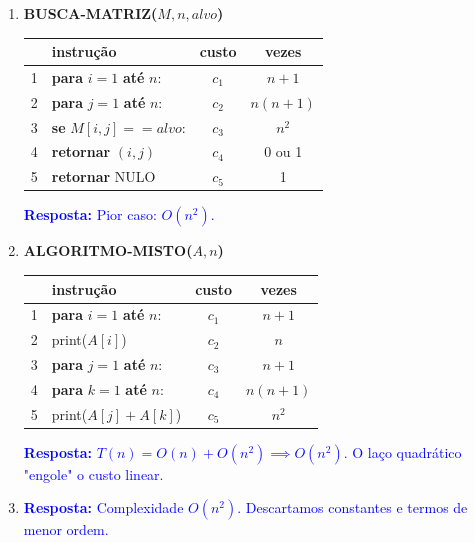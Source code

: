 \documentclass[12pt]{article}
\newcommand{\resposta}[1]{\textcolor{blue}{\textbf{Resposta:} #1}}
\begin{document}
\begin{enumerate}[label=\arabic*), leftmargin=1.5cm, itemsep=1cm]
    \item \textbf{BUSCA-MATRIZ($M, n, alvo$)} \\
    \begin{tcolorbox}[colback=white, colframe=black, fontupper=\small]
        \begin{tabular}{llcc}
            \hline
            & \textbf{instrução} & \textbf{custo} & \textbf{vezes} \\
            \hline
            1 & \textbf{para} $i = 1$ \textbf{até} $n$: & $c_1$ & $n+1$ \\
            2 & \quad \textbf{para} $j = 1$ \textbf{até} $n$: & $c_2$ & $n(n+1)$ \\
            3 & \quad \quad \textbf{se} $M[i,j] == alvo$: & $c_3$ & $n^2$ \\
            4 & \quad \quad \quad \textbf{retornar} $(i,j)$ & $c_4$ & 0 ou 1 \\
            5 & \textbf{retornar} NULO & $c_5$ & 1 \\
            \hline
        \end{tabular}
    \end{tcolorbox}
    \resposta{Pior caso: $O(n^2)$.}

    \item \textbf{ALGORITMO-MISTO($A, n$)} \\
    \begin{tcolorbox}[colback=white, colframe=black, fontupper=\small]
        \begin{tabular}{llcc}
            \hline
            & \textbf{instrução} & \textbf{custo} & \textbf{vezes} \\
            \hline
            1 & \textbf{para} $i = 1$ \textbf{até} $n$: & $c_1$ & $n+1$ \\
            2 & \quad print($A[i]$) & $c_2$ & $n$ \\
            3 & \textbf{para} $j = 1$ \textbf{até} $n$: & $c_3$ & $n+1$ \\
            4 & \quad \textbf{para} $k = 1$ \textbf{até} $n$: & $c_4$ & $n(n+1)$ \\
            5 & \quad \quad print($A[j] + A[k]$) & $c_5$ & $n^2$ \\
            \hline
        \end{tabular}
    \end{tcolorbox}
    \resposta{$T(n) = O(n) + O(n^2) \implies O(n^2)$. O laço quadrático "engole" o custo linear.}

    \item \resposta{Complexidade $O(n^2)$. Descartamos constantes e termos de menor ordem.}


\end{enumerate}
\end{document}
